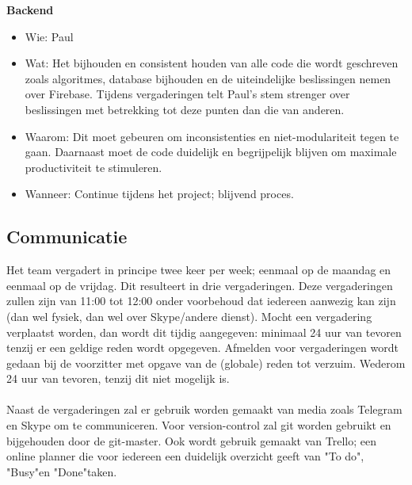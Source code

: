 \documentclass{uva-inf-article}
\begin{document}
\textbf{Backend}
\begin{itemize}
\item Wie: Paul
\item Wat: Het bijhouden en consistent houden van alle code die wordt geschreven zoals algoritmes, database bijhouden en de uiteindelijke beslissingen nemen over Firebase. Tijdens vergaderingen telt Paul's stem strenger over beslissingen met betrekking tot deze punten dan die van anderen.
\item Waarom: Dit moet gebeuren om inconsistenties en niet-modulariteit tegen te gaan. Daarnaast moet de code duidelijk en begrijpelijk blijven om maximale productiviteit te stimuleren.
\item Wanneer: Continue tijdens het project; blijvend proces.
\end{itemize}
\pagebreak
\subsection{Communicatie}
Het team vergadert in principe twee keer per week; eenmaal op de maandag en eenmaal op de vrijdag. Dit resulteert in drie vergaderingen. Deze vergaderingen zullen zijn van 11:00 tot 12:00 onder voorbehoud dat iedereen aanwezig kan zijn (dan wel fysiek, dan wel over Skype/andere dienst).
Mocht een vergadering verplaatst worden, dan wordt dit tijdig aangegeven: minimaal 24 uur van tevoren tenzij er een geldige reden wordt opgegeven.
Afmelden voor vergaderingen wordt gedaan bij de voorzitter met opgave van de (globale) reden tot verzuim. Wederom 24 uur van tevoren, tenzij dit niet mogelijk is.\\\\
\noindent
Naast de vergaderingen zal er gebruik worden gemaakt van media zoals Telegram en Skype om te communiceren. Voor version-control zal git worden gebruikt en bijgehouden door de git-master. Ook wordt gebruik gemaakt van Trello; een online planner die voor iedereen een duidelijk overzicht geeft van "To do", "Busy"\space en "Done"\space taken.
\end{document}
